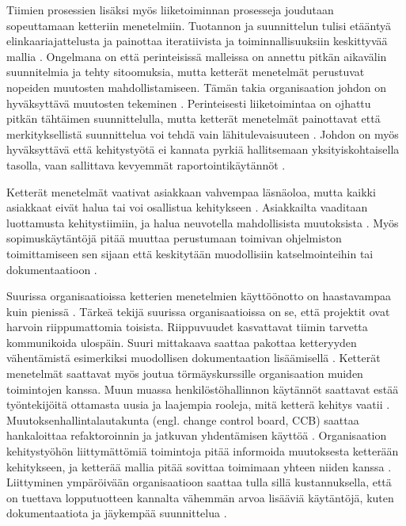 Tiimien prosessien lisäksi myös liiketoiminnan prosesseja joudutaan sopeuttamaan
ketteriin menetelmiin. Tuotannon ja suunnittelun tulisi etääntyä
elinkaariajattelusta ja painottaa iteratiivista ja toiminnallisuuksiin
keskittyvää mallia . Ongelmana on että perinteisissä
malleissa on annettu pitkän aikavälin suunnitelmia ja tehty sitoomuksia, mutta
ketterät menetelmät perustuvat nopeiden muutosten mahdollistamiseen. Tämän takia
organisaation johdon on hyväksyttävä muutosten tekeminen .
Perinteisesti liiketoimintaa on ojhattu pitkän tähtäimen suunnittelulla, mutta
ketterät menetelmät painottavat että merkityksellistä suunnittelua voi tehdä
vain lähitulevaisuuteen . Johdon on myös hyväksyttävä että
kehitystyötä ei kannata pyrkiä hallitsemaan yksityiskohtaisella tasolla, vaan
sallittava kevyemmät raportointikäytännöt .

Ketterät menetelmät vaativat asiakkaan vahvempaa läsnäoloa, mutta kaikki
asiakkaat eivät halua tai voi osallistua kehitykseen .
Asiakkailta vaaditaan luottamusta kehitystiimiin, ja halua neuvotella
mahdollisista muutoksista . Myös sopimuskäytäntöjä pitää
muuttaa perustumaan toimivan ohjelmiston toimittamiseen sen sijaan että
keskitytään muodollisiin katselmointeihin tai dokumentaatioon
.

Suurissa organisaatioissa ketterien menetelmien käyttöönotto on haastavampaa
kuin pienissä . Tärkeä tekijä suurissa
organisaatioissa on se, että projektit ovat harvoin riippumattomia toisista.
Riippuvuudet kasvattavat tiimin tarvetta kommunikoida ulospäin. Suuri mittakaava
saattaa pakottaa ketteryyden vähentämistä esimerkiksi muodollisen dokumentaation
lisäämisellä . Ketterät menetelmät saattavat myös joutua
törmäyskurssille organisaation muiden toimintojen kanssa. Muun muassa
henkilöstöhallinnon käytännöt saattavat estää työntekijöitä ottamasta uusia ja
laajempia rooleja, mitä ketterä kehitys vaatii .
Muutoksenhallintalautakunta (engl. change control board, CCB) saattaa
hankaloittaa refaktoroinnin ja jatkuvan yhdentämisen käyttöä
. Organisaation kehitystyöhön liittymättömiä toimintoja
pitää informoida muutoksesta ketterään kehitykseen, ja ketterää mallia pitää
sovittaa toimimaan yhteen niiden kanssa
. Liittyminen ympäröivään
organisaatioon saattaa tulla sillä kustannuksella, että on tuettava
lopputuotteen kannalta vähemmän arvoa lisääviä käytäntöjä, kuten dokumentaatiota
ja jäykempää suunnittelua .


